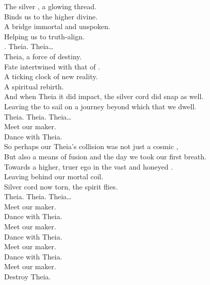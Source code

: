
\label{album:the-silver-cord}



The silver , a glowing thread. \\
Binds us to the higher divine. \\
A bridge immortal and unspoken. \\
Helping us to truth-align. \\

. Theia. Theia… \\

Theia, a force of destiny. \\
Fate intertwined with that of . \\
A ticking clock of new reality. \\
A spiritual rebirth. \\
And when Theia it did impact, the silver cord did snap as well. \\
Leaving the  to sail on a journey beyond which that we dwell. \\

Theia. Theia. Theia… \\

Meet our maker. \\
Dance with Theia. \\

So perhaps our Theia's collision was not just a cosmic , \\
But also a means of fusion and the day we took our first breath. \\
Towards a higher, truer ego in the vast and honeyed . \\
Leaving behind our mortal coil. \\
Silver cord now torn, the spirit flies. \\

Theia. Theia. Theia… \\

Meet our maker. \\
Dance with Theia. \\
Meet our maker. \\
Dance with Theia. \\
Meet our maker. \\
Dance with Theia. \\
Meet our maker. \\
Destroy Theia. \\


